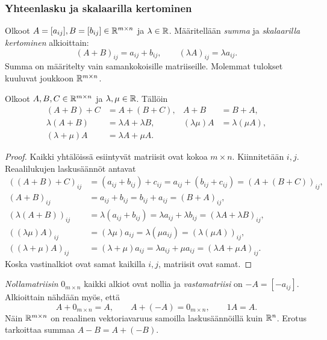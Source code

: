 \documentclass[11pt,a4paper]{amsart}
\begin{document}
  \subsubsection*{Yhteenlasku ja skalaarilla kertominen}

  \begin{definition}
    Olkoot $A=[a_{ij}],B=[b_{ij}]\in\mathbb{R}^{m\times n}$ ja
    $\lambda\in\mathbb{R}$. Määritellään \emph{summa} ja
    \emph{skalaarilla kertominen} alkioittain:
    \[
      \boxed{(A+B)_{ij}=a_{ij}+b_{ij},\qquad
      (\lambda A)_{ij}=\lambda a_{ij}.}
    \]
    Summa on määritelty vain samankokoisille matriiseille.
    Molemmat tulokset kuuluvat joukkoon $\mathbb{R}^{m\times n}$.
  \end{definition}

  \begin{lemma}
    Olkoot $A,B,C\in\mathbb{R}^{m\times n}$ ja $\lambda,\mu\in\mathbb{R}$.
    Tällöin
    \begin{align*}
      (A+B)+C&=A+(B+C), & A+B&=B+A,\\
      \lambda(A+B)&=\lambda A+\lambda B,
      & (\lambda\mu)A&=\lambda(\mu A),\\
      (\lambda+\mu)A&=\lambda A+\mu A.
    \end{align*}
  \end{lemma}
  \begin{proof}
    Kaikki yhtälöissä esiintyvät matriisit ovat kokoa $m\times n$.
    Kiinnitetään $i,j$. Reaalilukujen laskusäännöt antavat
    \begin{align*}
      ((A+B)+C)_{ij}
      &=(a_{ij}+b_{ij})+c_{ij}
      =a_{ij}+(b_{ij}+c_{ij})=(A+(B+C))_{ij},\\
      (A+B)_{ij}&=a_{ij}+b_{ij}=b_{ij}+a_{ij}=(B+A)_{ij},\\
      (\lambda(A+B))_{ij}
      &=\lambda(a_{ij}+b_{ij})
      =\lambda a_{ij}+\lambda b_{ij}=(\lambda A+\lambda B)_{ij},\\
      ((\lambda\mu)A)_{ij}
      &=(\lambda\mu)a_{ij}=\lambda(\mu a_{ij})
      =(\lambda(\mu A))_{ij},\\
      ((\lambda+\mu)A)_{ij}
      &=(\lambda+\mu)a_{ij}=\lambda a_{ij}+\mu a_{ij}
      =(\lambda A+\mu A)_{ij}.
    \end{align*}
    Koska vastinalkiot ovat samat kaikilla $i,j$, matriisit ovat samat.
  \end{proof}

  \emph{Nollamatriisin} $0_{m\times n}$ kaikki alkiot ovat nollia ja
  \emph{vastamatriisi} on $-A=[-a_{ij}]$. Alkioittain nähdään myös, että
  \[
    A+0_{m\times n}=A,\qquad A+(-A)=0_{m\times n},\qquad 1A=A.
  \]
  Näin $\mathbb{R}^{m\times n}$ on reaalinen vektoriavaruus samoilla
  laskusäännöillä kuin $\mathbb{R}^n$. Erotus tarkoittaa summaa $A-B=A+(-B)$.
\end{document}
